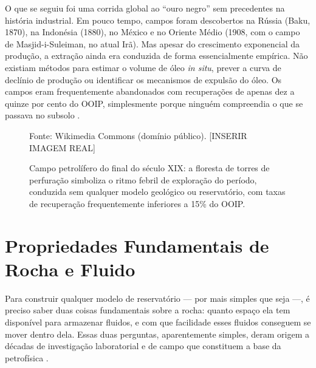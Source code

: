 \documentclass[
  12pt,
  a4paper,
  oneside,
  brazilian,
  sumario=tradicional
]{abntex2}
\renewcommand{\fonte}[1]{\vspace{2pt}\par\noindent\footnotesize Fonte: #1}
\begin{document}
O que se seguiu foi uma corrida global ao ``ouro negro'' sem
precedentes na história industrial. Em pouco tempo, campos foram
descobertos na Rússia (Baku, 1870), na Indonésia (1880), no México
e no Oriente Médio (1908, com o campo de Masjid-i-Suleiman, no atual
Irã). Mas apesar do crescimento exponencial da produção, a extração
ainda era conduzida de forma essencialmente empírica. Não existiam
métodos para estimar o volume de óleo \textit{in situ}, prever
a curva de declínio de produção ou identificar os mecanismos de
expulsão do óleo. Os campos eram frequentemente abandonados com
recuperações de apenas dez a quinze por cento do OOIP, simplesmente
porque ninguém compreendia o que se passava no subsolo
\cite{terry2015}.

\begin{figure}[H]
  \centering
  \caption{Campo petrolífero do final do século XIX: a floresta de torres de perfuração simboliza o ritmo febril de exploração do período, conduzida sem qualquer modelo geológico ou reservatório, com taxas de recuperação frequentemente inferiores a 15\% do OOIP.}
  \label{fig:campo_historico}
  \fonte{Wikimedia Commons (domínio público). [INSERIR IMAGEM REAL]}
\end{figure}

\section{Propriedades Fundamentais de Rocha e Fluido}
\label{sec:propriedades}

Para construir qualquer modelo de reservatório — por mais simples que
seja —, é preciso saber duas coisas fundamentais sobre a rocha: quanto
espaço ela tem disponível para armazenar fluidos, e com que facilidade
esses fluidos conseguem se mover dentro dela. Essas duas perguntas,
aparentemente simples, deram origem a décadas de investigação
laboratorial e de campo que constituem a base da petrofísica
\cite{rosa2006, mccain1990}.
\end{document}
